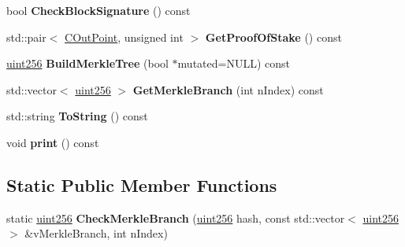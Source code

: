 \begin{DoxyCompactItemize}
bool {\bfseries Check\+Block\+Signature} () const
\item 
\mbox{\label{class_c_block_ab3e641daba5dd1a50fafc450ea8b2230}} 
std\+::pair$<$ \mbox{\hyperlink{class_c_out_point}{C\+Out\+Point}}, unsigned int $>$ {\bfseries Get\+Proof\+Of\+Stake} () const
\item 
\mbox{\label{class_c_block_aa65a6589dd8d0ce85d966eeb50a0723a}} 
\mbox{\hyperlink{classuint256}{uint256}} {\bfseries Build\+Merkle\+Tree} (bool $\ast$mutated=N\+U\+LL) const
\item 
\mbox{\label{class_c_block_a336b7154a9ab29c326941fa2491b2daa}} 
std\+::vector$<$ \mbox{\hyperlink{classuint256}{uint256}} $>$ {\bfseries Get\+Merkle\+Branch} (int n\+Index) const
\item 
\mbox{\label{class_c_block_a0e8a98f10831c00ae76b3a831c4804e5}} 
std\+::string {\bfseries To\+String} () const
\item 
\mbox{\label{class_c_block_a0507a658d82d5e4ec55d550460e06ff9}} 
void {\bfseries print} () const
\end{DoxyCompactItemize}
\subsection*{Static Public Member Functions}
\begin{DoxyCompactItemize}
\item 
\mbox{\label{class_c_block_a81684cf96f6fb6731c869865b80d1ccd}} 
static \mbox{\hyperlink{classuint256}{uint256}} {\bfseries Check\+Merkle\+Branch} (\mbox{\hyperlink{classuint256}{uint256}} hash, const std\+::vector$<$ \mbox{\hyperlink{classuint256}{uint256}} $>$ \&v\+Merkle\+Branch, int n\+Index)
\end{DoxyCompactItemize}
